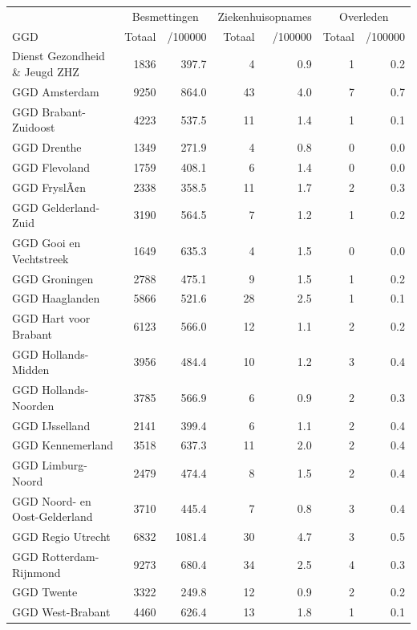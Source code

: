 \documentclass[
  english,
  man,floatsintext]{apa6}
\begin{document}
\begin{table}
\centering\begingroup\fontsize{10}{12}\selectfont

\begin{threeparttable}
\begin{tabular}{lrrrrrr}
\toprule
\multicolumn{1}{c}{ } & \multicolumn{2}{c}{Besmettingen} & \multicolumn{2}{c}{Ziekenhuisopnames} & \multicolumn{2}{c}{Overleden} \\
\cmidrule(l{3pt}r{3pt}){2-3} \cmidrule(l{3pt}r{3pt}){4-5} \cmidrule(l{3pt}r{3pt}){6-7}
GGD & Totaal & /100000 & Totaal & /100000 & Totaal & /100000\\
\midrule
Dienst Gezondheid \& Jeugd ZHZ & 1836 & 397.7 & 4 & 0.9 & 1 & 0.2\\
GGD Amsterdam & 9250 & 864.0 & 43 & 4.0 & 7 & 0.7\\
GGD Brabant-Zuidoost & 4223 & 537.5 & 11 & 1.4 & 1 & 0.1\\
GGD Drenthe & 1349 & 271.9 & 4 & 0.8 & 0 & 0.0\\
GGD Flevoland & 1759 & 408.1 & 6 & 1.4 & 0 & 0.0\\
GGD FryslÃ¢n & 2338 & 358.5 & 11 & 1.7 & 2 & 0.3\\
GGD Gelderland-Zuid & 3190 & 564.5 & 7 & 1.2 & 1 & 0.2\\
GGD Gooi en Vechtstreek & 1649 & 635.3 & 4 & 1.5 & 0 & 0.0\\
GGD Groningen & 2788 & 475.1 & 9 & 1.5 & 1 & 0.2\\
GGD Haaglanden & 5866 & 521.6 & 28 & 2.5 & 1 & 0.1\\
GGD Hart voor Brabant & 6123 & 566.0 & 12 & 1.1 & 2 & 0.2\\
GGD Hollands-Midden & 3956 & 484.4 & 10 & 1.2 & 3 & 0.4\\
GGD Hollands-Noorden & 3785 & 566.9 & 6 & 0.9 & 2 & 0.3\\
GGD IJsselland & 2141 & 399.4 & 6 & 1.1 & 2 & 0.4\\
GGD Kennemerland & 3518 & 637.3 & 11 & 2.0 & 2 & 0.4\\
GGD Limburg-Noord & 2479 & 474.4 & 8 & 1.5 & 2 & 0.4\\
GGD Noord- en Oost-Gelderland & 3710 & 445.4 & 7 & 0.8 & 3 & 0.4\\
GGD Regio Utrecht & 6832 & 1081.4 & 30 & 4.7 & 3 & 0.5\\
GGD Rotterdam-Rijnmond & 9273 & 680.4 & 34 & 2.5 & 4 & 0.3\\
GGD Twente & 3322 & 249.8 & 12 & 0.9 & 2 & 0.2\\
GGD West-Brabant & 4460 & 626.4 & 13 & 1.8 & 1 & 0.1\\

\end{tabular}
\end{threeparttable}
\end{table}
\end{document}
